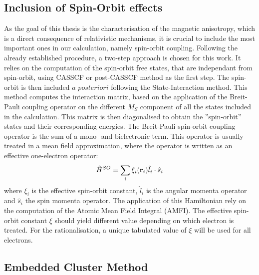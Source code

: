 \documentclass[12pt]{report}
\numberwithin{equation}{section}
\begin{document}
\subsection{Inclusion of Spin-Orbit effects}

As the goal of this thesis is the characterisation of the magnetic anisotropy, which is a direct consequence of relativistic mechanisms, it is crucial to include the most important ones in our calculation, namely spin-orbit coupling.
Following the already established procedure, a two-step approach is chosen for this work.
It relies on the computation of the spin-orbit free states, that are independant from spin-orbit, using CASSCF or post-CASSCF method as the first step.
The spin-orbit is then included $a$ $posteriori$ following the State-Interaction method.
This method computes the interaction matrix, based on the application of the Breit-Pauli coupling operator on the different $M_S$ component of all the states included in the calculation.
This matrix is then diagonalised to obtain the ''spin-orbit'' states and their corresponding energies.
The Breit-Pauli spin-orbit coupling operator is the sum of a mono- and bielectronic term.
This operator is usually treated in a mean field approximation, where the operator is written as an effective one-electron operator:
\begin{equation}
    \hat{H}^{SO}=\sum_{i} \xi_i(\vb r_i) \hat{l}_i \cdot \hat{s}_i
\end{equation}
where $\xi_i$ is the effective spin-orbit constant, $\hat{l}_i$ is the angular momenta operator and $\hat{s}_i$ the spin momenta operator.
The application of this Hamiltonian rely on the computation of the Atomic Mean Field Integral (AMFI).
The effective spin-orbit constant $\xi$ should yield different value depending on which electron is treated.
For the rationalisation, a unique tabulated value of $\xi$ will be used for all electrons.

\subsection{Embedded Cluster Method}
\end{document}
